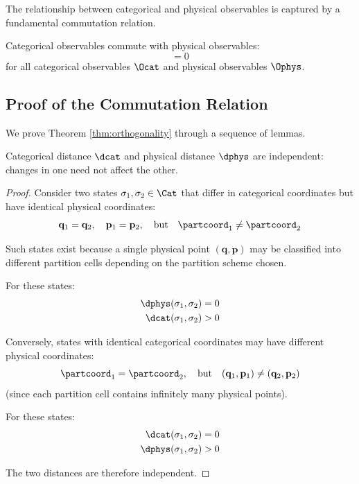 The relationship between categorical and physical observables is captured by a fundamental commutation relation.

\begin{theorem}
\label{thm:orthogonality}
Categorical observables commute with physical observables:
\begin{equation}
[\Ocat, \Ophys] = 0
\label{eq:commutation}
\end{equation}
for all categorical observables $\Ocat$ and physical observables $\Ophys$.
\end{theorem}

\subsection{Proof of the Commutation Relation}

We prove Theorem \ref{thm:orthogonality} through a sequence of lemmas.

\begin{lemma}
\label{lem:distance_orthogonality}
Categorical distance $\dcat$ and physical distance $\dphys$ are independent: changes in one need not affect the other.
\end{lemma}

\begin{proof}
Consider two states $\sigma_1, \sigma_2 \in \Cat$ that differ in categorical coordinates but have identical physical coordinates:
\begin{equation}
\mathbf{q}_1 = \mathbf{q}_2, \quad \mathbf{p}_1 = \mathbf{p}_2, \quad \text{but} \quad \partcoord_1 \neq \partcoord_2
\end{equation}

Such states exist because a single physical point $(\mathbf{q}, \mathbf{p})$ may be classified into different partition cells depending on the partition scheme chosen.

For these states:
\begin{align}
\dphys(\sigma_1, \sigma_2) &= 0 \\
\dcat(\sigma_1, \sigma_2) &> 0
\end{align}

Conversely, states with identical categorical coordinates may have different physical coordinates:
\begin{equation}
\partcoord_1 = \partcoord_2, \quad \text{but} \quad (\mathbf{q}_1, \mathbf{p}_1) \neq (\mathbf{q}_2, \mathbf{p}_2)
\end{equation}
(since each partition cell contains infinitely many physical points).

For these states:
\begin{align}
\dcat(\sigma_1, \sigma_2) &= 0 \\
\dphys(\sigma_1, \sigma_2) &> 0
\end{align}

The two distances are therefore independent.
\end{proof}

